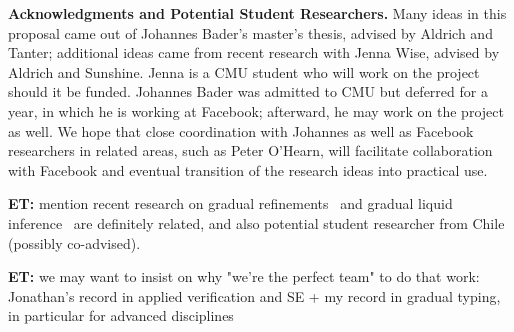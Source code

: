 \documentclass[10pt,twocolumn]{article}
\newcommand{\et}[1]{{\color{blue} {\bf ET:} #1}}
\newcommand{\minisec}[1]{\vspace{2ex}\noindent\textbf{#1}}
\begin{document}
\begin{sloppypar}
\minisec{Acknowledgments and Potential Student Researchers.}  Many ideas in this proposal came out of Johannes Bader's master's thesis, advised by Aldrich and Tanter; additional ideas came from recent research with Jenna Wise, advised by Aldrich and Sunshine.  Jenna is a CMU student who will work on the project should it be funded.  Johannes Bader was admitted to CMU but deferred for a year, in which he is working at Facebook; afterward, he may work on the project as well.  We hope that close coordination with Johannes as well as Facebook researchers in related areas, such as Peter O'Hearn, will facilitate collaboration with Facebook and eventual transition of the research ideas into practical use.

\et{mention recent research on gradual refinements~\cite{lehmannTanter:popl2017} and gradual liquid inference~\cite{vazouAl:oopsla2018} are definitely related, and also potential student researcher from Chile (possibly co-advised).}

\et{we may want to insist on why "we're the perfect team" to do that work: Jonathan's record in applied verification and SE + my record in gradual typing, in particular for advanced disciplines}




\end{sloppypar}
\end{document}
